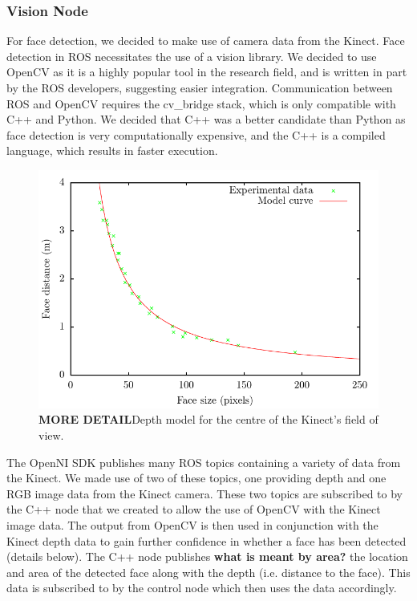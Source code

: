 \documentclass[conference]{IEEEtran}
\begin{document}
\subsubsection{Vision Node}
For face detection, we decided to make use of camera data from the Kinect. Face detection in ROS necessitates the use of a vision library. We decided to use OpenCV as it is a highly popular tool in the research field, and is written in part by the ROS developers, suggesting easier integration. Communication between ROS and OpenCV requires the cv\_bridge stack, which is only compatible with C++ and Python. We decided that C++ was a better candidate than Python as face detection is very computationally expensive, and the C++ is a compiled language, which results in faster execution.
\begin{figure}
  \includegraphics[width=\columnwidth]{centre_model}
  \caption{\textbf{MORE DETAIL}Depth model for the centre of the Kinect's field of view.}
  \label{fig:model}
\end{figure}
The OpenNI SDK publishes many ROS topics containing a variety of data from the Kinect. We made use of two of these topics, one providing depth and one RGB image data from the Kinect camera. These two topics are subscribed to by the C++ node that we created to allow the use of OpenCV with the Kinect image data. The output from OpenCV is then used in conjunction with the Kinect depth data to gain further confidence in whether a face has been detected (details below). The C++ node publishes \textbf{what is meant by area?} the location and area of the detected face along with the depth (i.e. distance to the face). This data is subscribed to by the control node which then uses the data accordingly.
\end{document}
